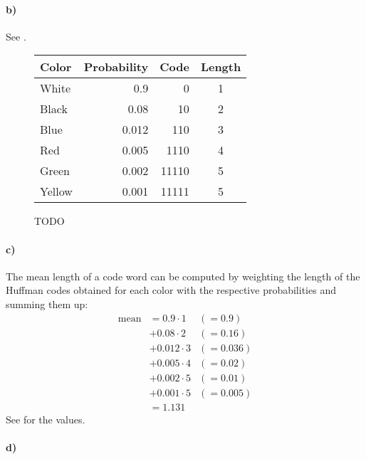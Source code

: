 \documentclass[a4paper,twocolumn]{article}
\begin{document}
	\paragraph{b)} %
	See .
	\begin{figure*}[t]
		\begin{minipage}{0.45\textwidth}
		\end{minipage}
		\hfill
		\begin{minipage}{0.45\textwidth}
			\begin{tabular}{l r r c}
				\textbf{Color} & \textbf{Probability} & \textbf{Code} & \textbf{Length}\\
				\hline
				White & 0.9 & 0 & 1 \\
				Black & 0.08 & 10 & 2 \\
				Blue & 0.012 & 110 & 3 \\
				Red & 0.005 & 1110 & 4 \\
				Green & 0.002 & 11110 & 5 \\
				Yellow & 0.001 & 11111 & 5
			\end{tabular}
		\end{minipage}
		\caption{TODO}
		\label{fig:huffman_code}
	\end{figure*}
	
	\paragraph{c)} %
	The mean length of a code word can be computed by weighting the length of the Huffman codes obtained for each color with the respective probabilities and summing them up:
	\begin{align*}
	\text{mean} 
	&= 0.9 \cdot 1 	 &(=0.9) \\
	&+ 0.08 \cdot 2  &(=0.16) \\
	&+ 0.012 \cdot 3 &(=0.036) \\ 
	&+ 0.005 \cdot 4 &(=0.02) \\ 
	&+ 0.002 \cdot 5 &(=0.01) \\ 
	&+ 0.001 \cdot 5 &(=0.005) \\ 
	&= 1.131
	\end{align*}
	See  for the values.
	
	\paragraph{d)} %
	
\end{document}
